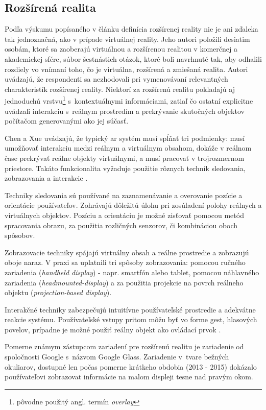 \subsection{Rozšírená realita}
Podľa výskumu popísaného v článku \cite{speicherWhatMixedReality2019a} definícia rozšírenej reality nie je ani zďaleka tak jednoznačná, ako v prípade virtuálnej reality. 
Jeho autori položili desiatim osobám, ktoré sa zaoberajú virtuálnou a rozšírenou realitou v komerčnej a akademickej sfére, súbor šestnástich otázok, ktoré boli 
navrhnuté tak, aby odhalili rozdiely vo vnímaní toho, čo je virtuálna, rozšírená a zmiešaná realita. Autori uvádzajú, že respondenti sa nezhodovali pri vymenovávaní
relevantných charakteristík rozšírenej reality. Niektorí za rozšírenú realitu pokladajú aj jednoduchú vrstvu\footnote{pôvodne použitý angl. termín \emph{overlay}} 
s~kontextuálnymi informáciami, zatiaľ čo ostatní explicitne uvádzali interakciu s~reálnym prostredím a prekrývanie skutočných objektov počítačom generovanými 
ako jej súčasť.

Chen a Xue uvádzajú, že typický \acrshort{ar} systém musí spĺňať tri podmienky: musí umožňovať interakciu medzi reálnym a virtuálnym obsahom, dokáže v reálnom čase 
prekrývať reálne objekty virtuálnymi, a musí pracovať v trojrozmernom priestore. Takáto funkcionalita vyžaduje použitie rôznych techník sledovania, zobrazovania a
interakcie \cite{chenRenaissanceAugmentedReality2022}.

Techniky sledovania sú používané na zaznamenávanie a overovanie pozície a orientácie používateľov. Zohrávajú dôležitú úlohu pri zosúladení polohy reálnych a virtuálnych
objektov. Pozíciu a orientáciu je možné zisťovať pomocou metód spracovania obrazu, za použitia rozličných senzorov, či kombináciou oboch spôsobov.

Zobrazovacie techniky spájajú virtuálny obsah a reálne prostredie a zobrazujú oboje naraz. V praxi sa uplatnili tri spôsoby zobrazovania: pomocou ručného zariadenia 
(\emph{handheld display}) - napr. smartfón alebo tablet, pomocou náhlavného zariadenia (\emph{headmounted-display}) a za použitia projekcie na povrch reálneho objektu 
(\emph{projection-based display}).

Interakčné techniky zabezpečujú intuitívne používateľské prostredie a adekvátne reakcie systému. Používateľské vstupy pritom môžu byť vo forme gest, hlasových povelov,
prípadne je možné použiť reálny objekt ako ovládací prvok \cite{chenRenaissanceAugmentedReality2022}.

\newpage Pomerne známym zástupcom zariadení pre rozšírenú realitu je zariadenie od spoločnosti Google s~názvom Google Glass. Zariadenie v~tvare bežných 
okuliarov, dostupné len počas pomerne krátkeho obdobia (2013 - 2015) \cite{brighamRealityCheckBasics2017} dokázalo používateľovi zobrazovat informácie na malom displeji tesne
nad pravým okom. 


